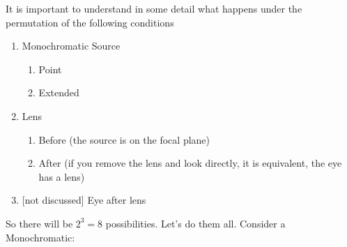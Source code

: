 It is important to understand in some detail what happens under the
permutation of the following conditions
\begin{enumerate}
\item Monochromatic Source

\begin{enumerate}
\item Point
\item Extended
\end{enumerate}
\item Lens

\begin{enumerate}
\item Before (the source is on the focal plane)
\item After (if you remove the lens and look directly, it is equivalent,
the eye has a lens)
\end{enumerate}
\item {[}not discussed{]} Eye after lens
\end{enumerate}
So there will be $2^{3}=8$ possibilities. Let's do them all. Consider
a Monochromatic:
